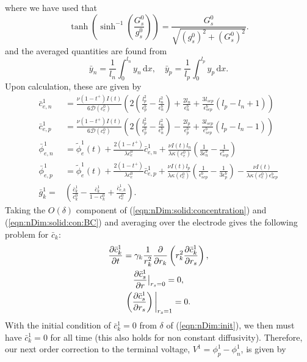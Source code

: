 \documentclass[preprint]{elsarticle}
\begin{document}
where we have used that
\begin{equation} 
	\tanh\left(\sinh^{-1}\left(\frac{G_s^0}{g_s^0} \right) \right) = \frac{G_s^0}{\sqrt{(g_s^0)^2 + (G_s^0)^2}}.
\end{equation}
and the averaged quantities are found from 
\begin{equation*}
	\bar{y}_n = \frac{1}{l_n}\int_{0}^{l_n}y_n\, \text{d}x, \quad 		\bar{y}_p = \frac{1}{l_p}\int_{0}^{l_p}y_p\, \text{d}x.
\end{equation*}
Upon calculation, these are given by 
\begin{align} 	
	\bar{c}_{e,n}^1 &= \frac{\nu (1-t^+) I(t)}{ 6 \mathcal{D}(c_e^0)}\left( 2\left(\frac{l_p^2}{\epsilon_p^b} - \frac{l_n^2}{\epsilon_n^b} \right) + \frac{2 l_n}{\epsilon_n^b} + \frac{3l_{sep}}{\epsilon_{sep}^{b}}(l_p-l_n+1)\right) \\ 
    \bar{c}_{e,p}^1 &= \frac{\nu (1-t^+) I(t)}{ 6 \mathcal{D}(c_e^0)}\left( 2\left(\frac{l_p^2}{\epsilon_p^b} - \frac{l_n^2}{\epsilon_n^b} \right) - \frac{2 l_p}{\epsilon_p^b} + \frac{3l_{sep}}{\epsilon_{sep}^{b}}(l_p-l_n-1)\right) \\ 
    \bar{\phi}_{e,n}^1 &= \tilde{\phi}_e^1(t) +\frac{2(1-t^+)}{\lambda c_e^0} \bar{c}_{e,n}^1 + \frac{\nu I(t)l_n}{\lambda \kappa(c_e^0)}\left(\frac{1}{3 \epsilon_{n}^b} - \frac{1}{\epsilon_{sep}^b}\right) \\ 
    \bar{\phi}_{e,p}^1 &= \tilde{\phi}_e^1(t) +\frac{2(1-t^+)}{\lambda c_e^0} \bar{c}_{e,p}^1 + \frac{\nu I(t)l_p}{\lambda \kappa(c_e^0)}\left(\frac{1}{ \epsilon_{sep}^b} - \frac{1}{3\epsilon_p^b}\right) - \frac{\nu I(t)}{\lambda \kappa(c_e^0)\epsilon_{sep}^b} \\
    \bar{g}_k^1 =& \left(\frac{\bar{c}_k^1}{c_k^0} - \frac{\bar{c}_k^1}{1-c_k^0} + \frac{\bar{c}_{e,k}^1}{c_e^0} \right).
\end{align} 
Taking the $O(\delta)$ component of (\ref{eqn:nDim:solid:concentration}) and (\ref{eqn:nDim:solid:con:BC}) and averaging over the electrode gives the following problem for $\bar{c}_k$: 
\begin{gather}
     \pdv{\bar{c}_k^1}{t} = \gamma_k \frac{1}{r_k^2}\pdv{r_k}\left(r_k^2 \pdv{\bar{c}_k^1}{r_s}\right), \\
     \pdv{\bar{c}_s^1}{r}\big|_{r_s=0} = 0, \\ 
     \left(\pdv{\bar{c}_s^1}{r_s}\right)\bigg|_{r_s=1} = 0.
    \end{gather} 
With the initial condition of $\bar{c}_k^1=0$ from $\mathcal{\delta}$ of (\ref{eqn:nDim:init}), we then must have ${\bar{c}_k^1=0}$ for all time (this also holds for non constant diffusivity). Therefore, our next order correction to the terminal voltage, ${V^1=\phi_p^1-\phi_n^1}$, is given by
\end{document}
